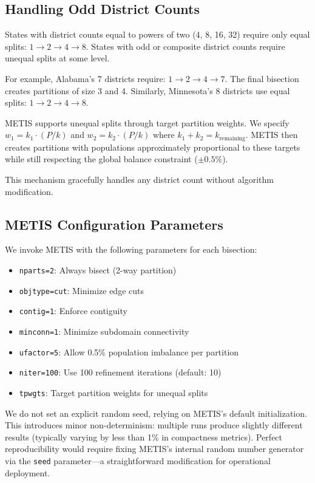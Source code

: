\subsection{Handling Odd District Counts}

States with district counts equal to powers of two (4, 8, 16, 32) require only equal splits: $1 \to 2 \to 4 \to 8$. States with odd or composite district counts require unequal splits at some level.

For example, Alabama's 7 districts require: $1 \to 2 \to 4 \to 7$. The final bisection creates partitions of size 3 and 4. Similarly, Minnesota's 8 districts use equal splits: $1 \to 2 \to 4 \to 8$.

METIS supports unequal splits through target partition weights. We specify $w_1 = k_1 \cdot (P/k)$ and $w_2 = k_2 \cdot (P/k)$ where $k_1 + k_2 = k_{\text{remaining}}$. METIS then creates partitions with populations approximately proportional to these targets while still respecting the global balance constraint ($\pm 0.5\%$).

This mechanism gracefully handles any district count without algorithm modification.

\subsection{METIS Configuration Parameters}

We invoke METIS with the following parameters for each bisection:

\begin{itemize}
    \item \texttt{nparts=2}: Always bisect (2-way partition)
    \item \texttt{objtype=cut}: Minimize edge cuts
    \item \texttt{contig=1}: Enforce contiguity
    \item \texttt{minconn=1}: Minimize subdomain connectivity
    \item \texttt{ufactor=5}: Allow 0.5\% population imbalance per partition
    \item \texttt{niter=100}: Use 100 refinement iterations (default: 10)
    \item \texttt{tpwgts}: Target partition weights for unequal splits
\end{itemize}

We do not set an explicit random seed, relying on METIS's default initialization. This introduces minor non-determinism: multiple runs produce slightly different results (typically varying by less than 1\% in compactness metrics). Perfect reproducibility would require fixing METIS's internal random number generator via the \texttt{seed} parameter—a straightforward modification for operational deployment.

